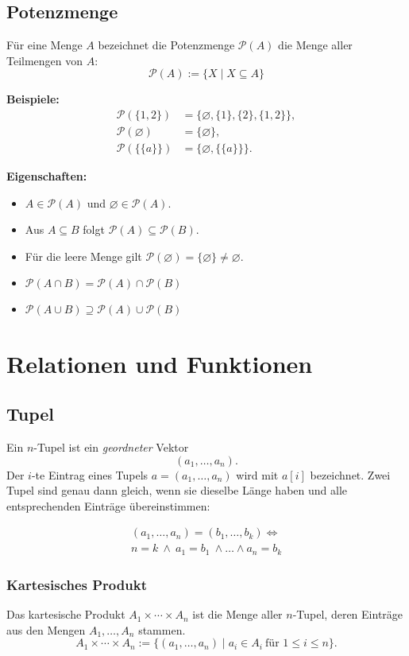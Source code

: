 \documentclass[10pt,landscape]{article}
\begin{document}
\begin{multicols*}{4}
\subsection{Potenzmenge}
Für eine Menge \(A\) bezeichnet die Potenzmenge \( \mathcal{P}(A) \) die Menge aller Teilmengen von \(A\):
\[
\mathcal{P}(A):=\{X \mid X\subseteq A\}
\]

\textbf{Beispiele:}
\begin{align*}
\mathcal{P}(\{1,2\}) &= \{\varnothing,\{1\},\{2\},\{1,2\}\},\\
\mathcal{P}(\varnothing) &= \{\varnothing\},\\
\mathcal{P}(\{\{a\}\}) &= \{\varnothing,\{\{a\}\}\}.
\end{align*}

\textbf{Eigenschaften:}
\begin{itemize}
  \item \(A\in\mathcal{P}(A)\) und \(\varnothing\in\mathcal{P}(A)\).
  \item Aus \(A\subseteq B\) folgt \(\mathcal{P}(A)\subseteq\mathcal{P}(B)\).
  \item Für die leere Menge gilt \(\mathcal{P}(\varnothing)=\{\varnothing\}\neq\varnothing\).
  \item \(\mathcal{P}(A\cap B)=\mathcal{P}(A)\cap\mathcal{P}(B)\)
  \item \(\mathcal{P}(A\cup B)\supseteq \mathcal{P}(A)\cup\mathcal{P}(B)\)
\end{itemize}


\section{Relationen und Funktionen}
\subsection{Tupel}
Ein \(n\)-Tupel ist ein \emph{geordneter} Vektor
\[
  (a_1,\dots,a_n).
\]
Der \(i\)-te Eintrag eines Tupels \(a=(a_1,\dots,a_n)\) wird mit \(a[i]\) bezeichnet.
Zwei Tupel sind genau dann gleich, wenn sie dieselbe Länge haben und alle entsprechenden Einträge übereinstimmen:

\begin{multline*}
  (a_1,\dots,a_n)=(b_1,\dots,b_k) \iff \\
  n=k\ \land\ a_1=b_1\ \land \dots \land a_n=b_k
\end{multline*}

\subsubsection{Kartesisches Produkt}
Das kartesische Produkt \(A_1\times\cdots\times A_n\) ist die Menge aller \(n\)-Tupel, deren Einträge aus den Mengen \(A_1,\dots,A_n\) stammen.
\[
  A_1\times\cdots\times A_n:=\{(a_1,\dots,a_n)\mid a_i\in A_i\ \text{für }1\le i\le n\}.
\]


\end{multicols*}
\end{document}
